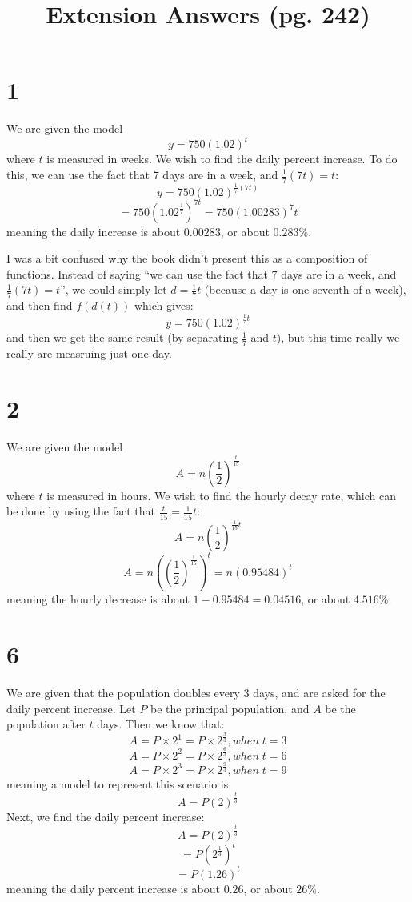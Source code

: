 \documentclass{article}
\title{Extension Answers (pg. 242)}
\theoremstyle{definition}
\newcommand{\?}{\stackrel{?}{=}}
\begin{document}
\maketitle

\section*{1}
We are given the model \[ y=750(1.02)^t \] where $t$ is measured in weeks. We wish to find the daily percent increase. To do this, we can use the fact that 
7 days are in a week, and $\frac{1}{7}(7t)=t$: \[ y=750(1.02)^{\frac{1}{7}(7t)} \] \[ =750(1.02^\frac{1}{7})^{7t}=750(1.00283)^7t \]
meaning the daily increase is about $0.00283$, or about $0.283\%$.


I was a bit confused why the book didn't present this as a composition of functions. Instead of saying \enquote{we can use the fact that 7 days are in a week, 
and $\frac{1}{7}(7t)=t$}, we could simply let $d=\frac{1}{7}t$ (because a day is one seventh of a week), and then find $f(d(t))$ which gives:
\[ y=750(1.02)^{\frac{1}{7}t} \] and then we get the same result (by separating $\frac{1}{7}$ and $t$), but this time really we really are measruing just one day. 

\section*{2}
We are given the model \[ A=n(\frac{1}{2})^\frac{t}{15} \]  where $t$ is measured in hours. We wish to find the hourly decay rate, which can be done by 
using the fact that $\frac{t}{15}=\frac{1}{15}t$: \[ A=n(\frac{1}{2})^{\frac{1}{15}t} \] \[ A=n((\frac{1}{2})^\frac{1}{15})^{t}=n(0.95484)^{t} \] meaning the hourly decrease is 
about $1-0.95484=0.04516$, or about $4.516\%$.

\section*{6}
We are given that the population doubles every 3 days, and are asked for the daily percent increase. Let $P$ be the principal population, and $A$ be the population after 
$t$ days. Then we know that:
\[ A=P\times 2^1=P\times 2^\frac{3}{3},when\; t=3 \] \[ A=P\times 2^2=P\times 2^\frac{6}{3},when\; t=6 \] \[ A=P\times 2^3=P\times 2^\frac{9}{3},when\; t=9 \]
meaning a model to represent this scenario is \[ A=P(2)^\frac{t}{3} \] Next, we find the daily percent increase:
\[ A=P(2)^\frac{t}{3} \] \[ =P(2^\frac{1}{3})^t \] \[ =P(1.26)^t \] meaning the daily percent increase is about $0.26$, or about $26\%$.
\end{document}
